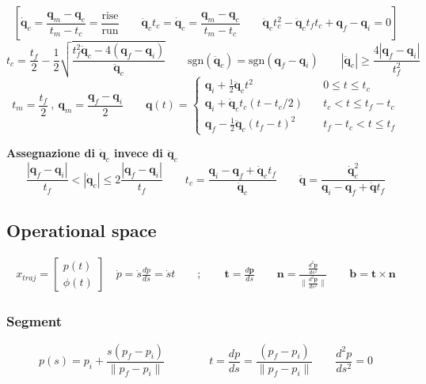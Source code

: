 $$
\left[
\bm{\dot{q}}_c 
= 
\frac{\bm{q}_m - \bm{q}_c}{t_m - t_c}
=
\frac{\text{rise}}{\text{run}}
\qquad
\bm{\ddot{q}}_c t_c
=
\bm{\dot{q}}_c
=
\frac{\bm{q}_m - \bm{q}_c}{t_m - t_c}
\qquad
\bm{\ddot{q}}_ct_c^2
-
\bm{\ddot{q}}_c t_f t_c
+
\bm{q}_f - \bm{q}_i = 0
\right]
$$
\vspace*{10pt}
$$
t_c
=
\frac{t_f}{2} - \frac{1}{2}
\sqrt{
	\frac{t_f^2 \ddot{\bm{q}}_c - 4(\bm{q}_f - \bm{q}_i)}{\bm{\ddot{q}}_c}
}
\qquad
\text{sgn}(\ddot{\bm{q}}_c)
=
\text{sgn}(\bm{q}_f - \bm{q}_i)
\qquad
|\ddot{\bm{q}}_c| \ge \frac{4|\bm{q}_f - \bm{q}_i|}{t_f^2}
$$
\vspace*{10pt}
$$
t_m = \frac{t_f}{2} \ , \ \bm{q}_m = \frac{\bm{q}_f - \bm{q}_i}{2}
\qquad
\bm{q}(t)
=
\begin{cases}
	\bm{q}_i + \frac{1}{2} \ddot{\bm{q}}_c t^2 & \quad 0 \leq t \leq t_c \\
	\bm{q}_i + \ddot{\bm{q}}_c t_c (t - t_c/2) & \quad t_c < t \leq t_f - t_c \\
	\bm{q}_f - \frac{1}{2} \ddot{\bm{q}}_c (t_f - t)^2 & \quad t_f - t_c < t \leq t_f
\end{cases}
$$


\vspace*{10pt}
\textbf{Assegnazione di $\bm{\dot{q}}_c$ invece di $\bm{\ddot{q}}_c$}
\vspace*{5pt}
$$
\frac{|\bm{q}_f - \bm{q}_i|}{t_f}
<
|\bm{\dot{q}}_c|
\leq
2 \frac{|\bm{q}_f - \bm{q}_i|}{t_f}
\qquad
t_c = \frac{\bm{q}_i - \bm{q}_f + \bm{\dot{q}}_c t_f }{\dot{\bm{q}}_c}
\qquad
\bm{\ddot{q}}
=
\frac{\bm{\dot{q}}_c^2}{\bm{q}_i - \bm{q}_f + \bm{\dot{q}} t_f}
$$





\subsection{Operational space}
\begin{align*}
	x_{traj} = \begin{bmatrix}p(t) \\ \phi(t) \end{bmatrix}
	\quad
	\dot{p} = \dot{s} \frac{dp}{ds} = \dot{s}{t}
	\qquad ; \qquad
	\bm{t} = \frac{d\bm{p}}{ds}
	\qquad
	\bm{n} = \frac{\frac{d^2 \bm{p}}{ds^2}}{\| \frac{d^2 \bm{p}}{ds^2} \|}
	\qquad
	\bm{b} = \bm{t} \times \bm{n}
\end{align*}


\subsubsection{Segment}
$$
p(s) = p_i + \frac{s(p_f - p_i)}{\| p_f - p_i \|}
\qquad \qquad
t = \frac{dp}{ds} = \frac{(p_f - p_i)}{\| p_f - p_i \|}
\qquad
\frac{d^2p}{ds^2} = 0
$$

